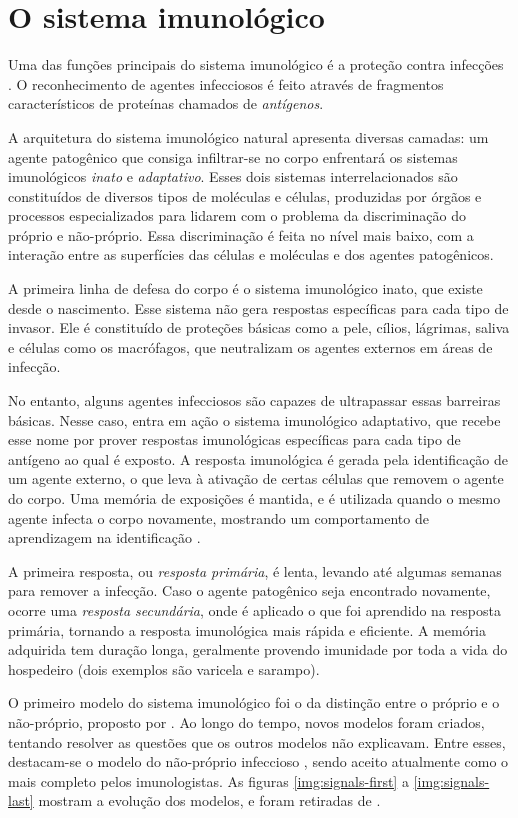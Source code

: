 \chapter{O sistema imunológico}

Uma das funções principais do sistema imunológico é a proteção contra infecções \cite{Cayzer2007}. O reconhecimento de agentes infecciosos é feito através de fragmentos característicos de proteínas chamados de \emph{antígenos}.

A arquitetura do sistema imunológico natural apresenta diversas camadas: um agente patogênico que consiga infiltrar-se no corpo enfrentará os sistemas imunológicos \emph{inato} e \emph{adaptativo}. Esses dois sistemas interrelacionados são constituídos de diversos tipos de moléculas e células, produzidas por órgãos e processos especializados para lidarem com o problema da discriminação do próprio e não-próprio. Essa discriminação é feita no nível mais baixo, com a interação entre as superfícies das células e moléculas e dos agentes patogênicos.

A primeira linha de defesa do corpo é o sistema imunológico inato, que existe desde o nascimento. Esse sistema não gera respostas específicas para cada tipo de invasor. Ele é constituído de proteções básicas como a pele, cílios, lágrimas, saliva e células como os macrófagos, que neutralizam os agentes externos em áreas de infecção.

No entanto, alguns agentes infecciosos são capazes de ultrapassar essas barreiras básicas. Nesse caso, entra em ação o sistema imunológico adaptativo, que recebe esse nome por prover respostas imunológicas específicas para cada tipo de antígeno ao qual é exposto. A resposta imunológica é gerada pela identificação de um agente externo, o que leva à ativação de certas células que removem o agente do corpo. Uma memória de exposições é mantida, e é utilizada quando o mesmo agente infecta o corpo novamente, mostrando um comportamento de aprendizagem na identificação \cite{Brownlee2011}.

A primeira resposta, ou \emph{resposta primária}, é lenta, levando até algumas semanas para remover a infecção. Caso o agente patogênico seja encontrado novamente, ocorre uma \emph{resposta secundária}, onde é aplicado o que foi aprendido na resposta primária, tornando a resposta imunológica mais rápida e eficiente. A memória adquirida tem duração longa, geralmente provendo imunidade por toda a vida do hospedeiro (dois exemplos são varicela e sarampo).

O primeiro modelo do sistema imunológico foi o da distinção entre o próprio e o não-próprio, proposto por \citet{Burnet1959}. Ao longo do tempo, novos modelos foram criados, tentando resolver as questões que os outros modelos não explicavam. Entre esses, destacam-se o modelo do não-próprio infeccioso \cite{Janeway1989}, sendo aceito atualmente como o mais completo pelos imunologistas. As figuras \ref{img:signals-first} a \ref{img:signals-last} mostram a evolução dos modelos, e foram retiradas de \citet{Aickelin2002}.

